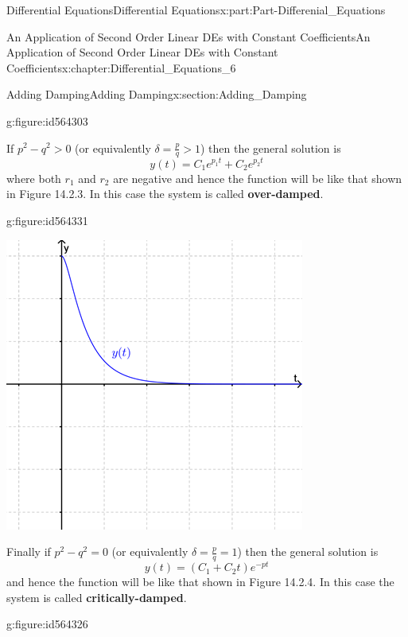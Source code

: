 \documentclass[oneside,10pt,]{book}
\newcommand{\terminology}[1]{\textbf{#1}}
\numberwithin{equation}{section}
\newcommand{\gt}{>}
\begin{document}
\begin{partptx}{Differential Equations}{}{Differential Equations}{}{}{x:part:Part-Differenial_Equations}
\begin{chapterptx}{An Application of Second Order Linear DEs with Constant Coefficients}{}{An Application of Second Order Linear DEs with Constant Coefficients}{}{}{x:chapter:Differential_Equations_6}
\begin{sectionptx}{Adding Damping}{}{Adding Damping}{}{}{x:section:Adding_Damping}
\begin{figureptx}{}{g:figure:id564303}{}
\tcblower
\end{figureptx}%
%
\par
If \(p^2-q^2\gt 0\) (or equivalently \(\delta=\frac{p}{q}\gt 1\)) then the general solution is%
\begin{equation*}
y(t)=C_1e^{p_1t}+C_2e^{p_2t}
\end{equation*}
where both \(r_1\) and \(r_2\) are negative and hence the function will be like that shown in Figure 14.2.3. In this case the system is called \terminology{over-damped}. \begin{figureptx}{}{g:figure:id564331}{}%
\begin{image}{0.2}{0.6}{0.2}%
\includegraphics[width=\linewidth]{./DifferentialEquations/Images/6/figure_6.png}
\end{image}%
\tcblower
\end{figureptx}%
 Finally if \(p^2-q^2=0\) (or equivalently \(\delta=\frac{p}{q}=1\)) then the general solution is%
\begin{equation*}
y(t)=(C_1+C_2t)e^{-pt}
\end{equation*}
and hence the function will be like that shown in Figure 14.2.4. In this case the system is called \terminology{critically-damped}. \begin{figureptx}{}{g:figure:id564326}{}%
\begin{image}{0.2}{0.6}{0.2}%

\end{image}
\end{figureptx}
\end{sectionptx}
\end{chapterptx}
\end{partptx}
\end{document}
